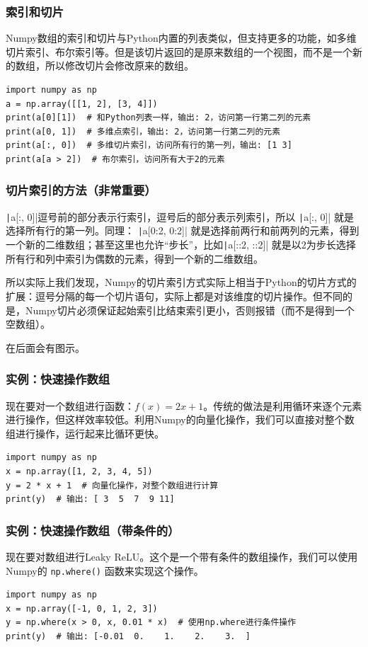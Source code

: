 \begin{frame}[fragile]
    \frametitle{索引和切片}

    Numpy数组的索引和切片与Python内置的列表类似，但支持更多的功能，如多维切片索引、布尔索引等。但是该切片返回的是原来数组的一个视图，而不是一个新的数组，所以修改切片会修改原来的数组。
    \begin{verbatim}
import numpy as np
a = np.array([[1, 2], [3, 4]])
print(a[0][1])  # 和Python列表一样，输出: 2，访问第一行第二列的元素
print(a[0, 1])  # 多维点索引，输出: 2，访问第一行第二列的元素
print(a[:, 0])  # 多维切片索引，访问所有行的第一列，输出: [1 3]
print(a[a > 2])  # 布尔索引，访问所有大于2的元素
    \end{verbatim}

\end{frame}

\begin{frame}
    \frametitle{切片索引的方法（非常重要）}

    \texttt|a[:, 0]|逗号前的部分表示行索引，逗号后的部分表示列索引，所以 \texttt|a[:, 0]| 就是选择所有行的第一列。同理： \texttt|a[0:2, 0:2]| 就是选择前两行和前两列的元素，得到一个新的二维数组；甚至这里也允许“步长”，比如\texttt|a[::2, ::2]| 就是以2为步长选择所有行和列中索引为偶数的元素，得到一个新的二维数组。

    所以实际上我们发现，Numpy的切片索引方式实际上相当于Python的切片方式的扩展：逗号分隔的每一个切片语句，实际上都是对该维度的切片操作。但不同的是，Numpy切片必须保证起始索引比结束索引更小，否则报错（而不是得到一个空数组）。

    在后面会有图示。
\end{frame}

\begin{frame}[fragile]
    \frametitle{实例：快速操作数组}

    现在要对一个数组进行函数：$f(x) = 2x + 1$。传统的做法是利用循环来逐个元素进行操作，但这样效率较低。利用Numpy的向量化操作，我们可以直接对整个数组进行操作，运行起来比循环更快。

    \begin{verbatim}
import numpy as np
x = np.array([1, 2, 3, 4, 5])
y = 2 * x + 1  # 向量化操作，对整个数组进行计算
print(y)  # 输出: [ 3  5  7  9 11]
    \end{verbatim}

\end{frame}

\begin{frame}[fragile]
    \frametitle{实例：快速操作数组（带条件的）}

    现在要对数组进行Leaky ReLU。这个是一个带有条件的数组操作，我们可以使用Numpy的 \texttt{np.where()} 函数来实现这个操作。

    \begin{verbatim}
import numpy as np
x = np.array([-1, 0, 1, 2, 3])
y = np.where(x > 0, x, 0.01 * x)  # 使用np.where进行条件操作
print(y)  # 输出: [-0.01  0.    1.    2.    3.  ]
    \end{verbatim}

\end{frame}

